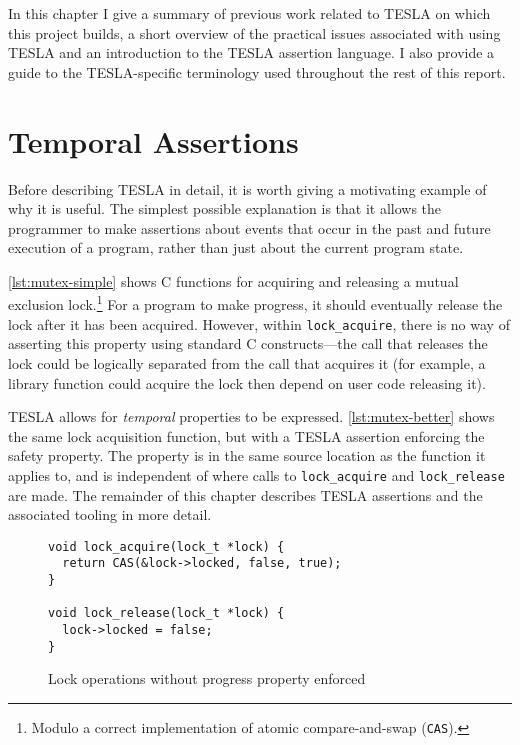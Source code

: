 In this chapter I give a summary of previous work related to TESLA on which this
project builds, a short overview of the practical issues associated with using
TESLA and an introduction to the TESLA assertion language. I also provide a
guide to the TESLA-specific terminology used throughout the rest of this report.

\section{Temporal Assertions}

Before describing TESLA in detail, it is worth giving a motivating example of
why it is useful. The simplest possible explanation is that it allows the
programmer to make assertions about events that occur in the past and future
execution of a program, rather than just about the current program state.

\autoref{lst:mutex-simple} shows C functions for acquiring and releasing a
mutual exclusion lock.\footnote{Modulo a correct implementation of atomic
compare-and-swap (\texttt{CAS}).} For a program to make progress, it
should eventually release the lock after it has been acquired.  However, within
\texttt{lock_acquire}, there is no way of asserting this property using
standard C constructs---the call that releases the lock could be logically
separated from the call that acquires it (for example, a library function could
acquire the lock then depend on user code releasing it).

TESLA allows for \emph{temporal} properties to be expressed.
\autoref{lst:mutex-better} shows the same lock acquisition function, but with a
TESLA assertion enforcing the safety property. The property is in the same
source location as the function it applies to, and is independent of where calls
to \texttt{lock_acquire} and \texttt{lock_release} are made. The
remainder of this chapter describes TESLA assertions and the associated tooling
in more detail.

\begin{figure}
  \begin{verbatim}
void lock_acquire(lock_t *lock) {
  return CAS(&lock->locked, false, true);
}

void lock_release(lock_t *lock) {
  lock->locked = false;
}
  \end{verbatim}
  \caption{Lock operations without progress property enforced}
  \label{lst:mutex-simple}
\end{figure}


